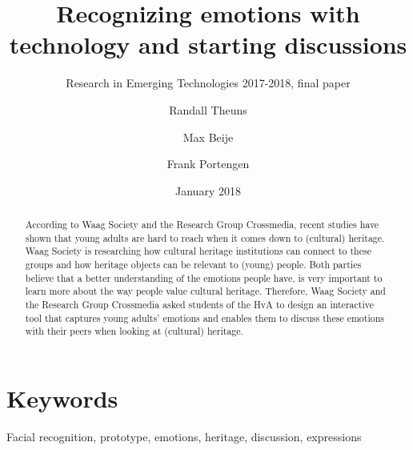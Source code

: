 \documentclass[sigconf]{acmart}
\begin{document}
\title{Recognizing emotions with technology and starting discussions}
\subtitle{Research in Emerging Technologies 2017-2018, final paper}
\date{January 2018}

\author{Randall Theuns}

\author{Max Beije}

\author{Frank Portengen}

\begin{abstract}
\noindent
According to Waag Society and the Research Group Crossmedia, recent studies have shown that
young adults are hard to reach when it comes down to (cultural) heritage.
Waag Society is researching how cultural heritage institutions can connect to these groups and 
how heritage objects can be relevant to (young) people.
Both parties believe that a better understanding of the emotions people have,
is very important to learn more about the way people value cultural heritage.
Therefore, Waag Society and the Research Group Crossmedia asked students of the HvA to
design an interactive tool that captures young adults’ emotions and enables them to discuss
these emotions with their peers when looking at (cultural) heritage.
\end{abstract}

\maketitle


\section{Keywords}
Facial recognition, prototype, emotions, heritage, discussion, expressions
\end{document}

